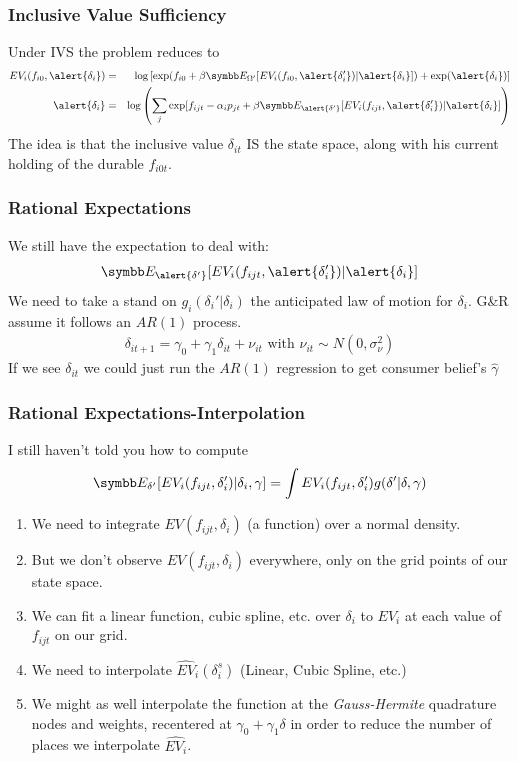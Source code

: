 \documentclass[aspectratio=169,11pt]{beamer}
\begin{document}
\begin{frame}
\frametitle{Inclusive Value Sufficiency}
Under IVS the problem reduces to
\begin{eqnarray*}
EV_i(f_{i0}, \alert{\delta_i}) &=& \log\left[ \exp( f_{i0} + \beta \E_{\Omega'}[ EV_i (f_{i0}, \alert{\delta_i'}) |\alert{\delta_i}] )+ \exp(\alert{\delta_i})  \right]\\
\alert{\delta_{i}} &=& \log \left( \sum_j \exp[ f_{ijt}  -\alpha_i p_{jt} + \beta \E_{\alert{\delta'}}[ E V_i (f_{ijt}, \alert{\delta_i'}) |\alert{\delta_i} ]  \right)
\end{eqnarray*}
The idea is that the inclusive value $\delta_{it}$ IS the state space, along with his current holding of the durable $f_{i0t}$.
\end{frame}


\begin{frame}
\frametitle{Rational Expectations}
We still have the expectation to deal with: 
\begin{eqnarray*}
\E_{\alert{\delta'}}[ E V_i (f_{ijt}, \alert{\delta_i'}) |\alert{\delta_i} ]
\end{eqnarray*}
We need to take a stand on $g_i(\delta_i' | \delta_i)$ the anticipated law of motion for $\delta_i$.  G\&R assume it follows an $AR(1)$ process.
\begin{eqnarray*}
\delta_{it+1} = \gamma_0 + \gamma_1 \delta_{it} + \nu_{it} \mbox{ with } \nu_{it} \sim N(0,\sigma_{\nu}^2)
\end{eqnarray*}
If we see $\delta_{it}$ we could just run the $AR(1)$ regression to get consumer belief's $\hat{\gamma}$
\end{frame}


\begin{frame}
\frametitle{Rational Expectations-Interpolation}
I still haven't told you how to compute
\begin{eqnarray*}
\E_{\delta'}[ E V_i (f_{ijt}, \delta_i') |\delta_i ,\gamma]= \int EV_i(f_{ijt},\delta_{i}') g(\delta' | \delta,\gamma)
\end{eqnarray*}
\vspace{-0.5cm}
\begin{enumerate}
\item We need to integrate $EV(f_{ijt},\delta_i)$ (a function) over a normal density.
\item But we don't observe $EV(f_{ijt},\delta_i)$ everywhere, only on the grid points of our state space.
\item We can fit a linear function, cubic spline, etc. over $\delta_i$ to $EV_i$ at each value of $f_{ijt}$ on our grid.
\item  We need to \alert{interpolate} $\widehat{EV}_i(\delta_i^s)$ (Linear, Cubic Spline, etc.)
\item We might as well interpolate the function at the \textit{Gauss-Hermite} quadrature nodes and weights, recentered at $\gamma_0 + \gamma_1 \delta$ in order to reduce the number of places we interpolate $\widehat{EV_i}$.
\end{enumerate}
\end{frame}
\end{document}
